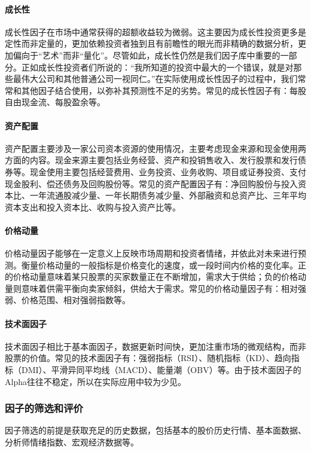 \paragraph{成长性} 成长性因子在市场中通常获得的超额收益较为微弱。这主要因为成长性投资更多是定性而非定量的，更加依赖投资者独到且有前瞻性的眼光而非精确的数据分析，更加偏向于“艺术”而非“量化”。尽管如此，成长性仍然是我们因子库中重要的一部分。正如成长性投资者们所说的：“我所知道的投资中最大的一个错误，就是对那些最伟大公司和其他普通公司一视同仁。”在实际使用成长性因子的过程中，我们常常和其他因子结合使用，以弥补其预测性不足的劣势。常见的成长性因子有：每股自由现金流、每股盈余等。

\paragraph{资产配置} 资产配置主要涉及一家公司资本资源的使用情况，主要考虑现金来源和现金使用两方面的内容。现金来源主要包括业务经营、资产和投销售收入、发行股票和发行债券等。现金使用主要包括经营费用、业务投资、业务收购、项目或证券投资、支付现金股利、偿还债务及回购股份等。常见的资产配置因子有：净回购股份与投入资本比、一年流通股减少量、一年长期债务减少量、外部融资和总资产比、三年平均资本支出和投入资本比、收购与投入资产比等。

\paragraph{价格动量} 价格动量因子能够在一定意义上反映市场周期和投资者情绪，并依此对未来进行预测。衡量价格动量的一般指标是价格变化的速度，或一段时间内价格的变化率。正的价格动量意味着某只股票的买家数量正在不断增加，需求大于供给；负的价格动量则意味着供需平衡向卖家倾斜，供给大于需求。常见的价格动量因子有：相对强弱、价格范围、相对强弱指数等。

\paragraph{技术面因子} 技术面因子相比于基本面因子，数据更新时间快，更加注重市场的微观结构，而非股票的价值。常见的技术面因子有：强弱指标（RSI）、随机指标（KD）、趋向指标（DMI）、平滑异同平均线（MACD）、能量潮（OBV）等。由于技术面因子的Alpha往往不稳定，所以在实际应用中较为少见。
\subsubsection*{因子的筛选和评价}
因子筛选的前提是获取充足的历史数据，包括基本的股价历史行情、基本面数据、分析师情绪指数、宏观经济数据等。

